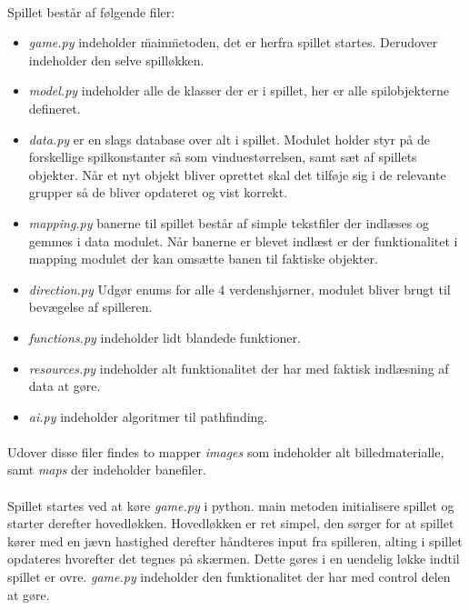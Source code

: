 \documentclass[10pt,a4paper,danish]{article}
\begin{document}
\paragraph{}
Spillet består af følgende filer:
\begin{itemize}
\item \textit{game.py} indeholder \"main\" metoden, det er herfra spillet startes. Derudover indeholder den selve spilløkken.
\item \textit{model.py} indeholder alle de klasser der er i spillet, her er alle spilobjekterne defineret.
\item \textit{data.py} er en slags database over alt i spillet. Modulet holder styr på de forskellige spilkonstanter så som vinduestørrelsen, samt sæt af spillets objekter. Når et nyt objekt bliver oprettet skal det tilføje sig i de relevante grupper så de bliver opdateret og vist korrekt.
\item \textit{mapping.py} banerne til spillet består af simple tekstfiler der indlæses og gemmes i data modulet. Når banerne er blevet indlæst er der funktionalitet i mapping modulet der kan omsætte banen til faktiske objekter.
\item \textit{direction.py} Udgør enums for alle 4 verdenshjørner, modulet bliver brugt til bevægelse af spilleren.
\item \textit{functions.py} indeholder lidt blandede funktioner.
\item \textit{resources.py} indeholder alt funktionalitet der har med faktisk indlæsning af data at gøre.
\item \textit{ai.py} indeholder algoritmer til pathfinding.
\end{itemize}

\paragraph{}
Udover disse filer findes to mapper \textit{images} som indeholder alt billedmaterialle, samt \textit{maps} der indeholder banefiler.

\paragraph{}
Spillet startes ved at køre \textit{game.py} i python. main metoden initialisere spillet og starter derefter hovedløkken. Hovedløkken er ret simpel, den sørger for at spillet kører med en jævn hastighed derefter håndteres input fra spilleren, alting i spillet opdateres hvorefter det tegnes på skærmen. Dette gøres i en uendelig løkke indtil spillet er ovre. \textit{game.py} indeholder den funktionalitet der har med control delen at gøre.
\end{document}
